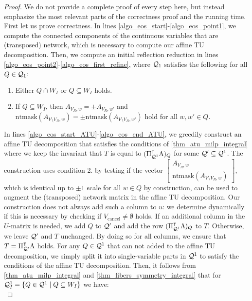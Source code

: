 \documentclass[pdflatex,sn-mathphys-num]{sn-jnl}%
\theoremstyle{thmstyleone}%
\theoremstyle{thmstylethree}%
\theoremstyle{thmstyletwo}%
\begin{document}
\begin{proof}
We do not provide a complete proof of every step here, but instead emphasize the most relevant parts of the correctness proof and the running time. First let us prove correctness. 
    In lines \ref{algo_eos_start}-\ref{algo_eos_point1}, we compute the connected components of the continuous variables that are (transposed) network, which is necessary to compute our affine TU decomposition.
    Then, we compute an initial reflection reduction in lines \ref{algo_eos_point2}-\ref{algo_eos_first_refine}, where $\mathcal{Q}_1$ satisfies the following for all $Q\in \mathcal{Q}_1$:
    \begin{enumerate}
        \item Either $Q\cap W_I$ or $Q\subseteq W_I$ holds.
        \item If $Q\subseteq W_I$, then $A_{V_R,w} = \pm A_{V_R,w'}$ and $\mathrm{ntmask}(A_{V\setminus V_R,w}) = \pm \mathrm{ntmask}(A_{V\setminus V_R,w'})$ hold for all $w,w'\in Q$.
    \end{enumerate}
    In lines \ref{algo_eos_start_ATU}-\ref{algo_eos_end_ATU}, we greedily construct an affine TU decomposition that satisfies the conditions of \cref{thm_atu_milp_integral} where we keep the invariant that $T$ is equal to $(\Pi_{\mathcal{Q}^1}^{\intercal} \Lambda)_Q$ for some $\mathcal{Q}'\subseteq \mathcal{Q}^1$. The construction uses condition 2. by testing if the vector $\begin{bmatrix}
        A_{V_R,w} \\
        \mathrm{ntmask}(A_{V\setminus V_R,w})
    \end{bmatrix}$, which is identical up to $\pm 1 $ scale for all $w\in Q$ by construction, can be used to augment the (transposed) network matrix in the affine TU decomposition. Our construction does not always add such a column to $u$: we determine dynamically if this is necessary by checking if $V_{\mathrm{cancel}} \neq \emptyset$ holds.
    If an additional column in the $U$-matrix is needed, we add $Q$ to $\mathcal{Q}'$ and add the row $(\Pi_{\mathcal{Q}^1}^{\intercal} \Lambda)_Q$ to $T$. Otherwise, we leave $\mathcal{Q}'$ and $T$ unchanged. By doing so for all columns, we ensure that $T = \Pi_{\mathcal{Q}'}^{\intercal} \Lambda$ holds.
    For any $Q\in \mathcal{Q}^1$ that can not added to the affine TU decomposition, we simply split it into single-variable parts in $\mathcal{Q}^1$ to satisfy the conditions of the affine TU decomposition.
    Then, it follows from \cref{thm_atu_milp_integral} and \cref{thm_fibers_symmetry_integral} that for $\mathcal{Q}^1_I = \{Q \in \mathcal{Q}^1 \mid Q\subseteq W_I \}$ we have:
    \begin{equation}

\end{equation}
\end{proof}
\end{document}
